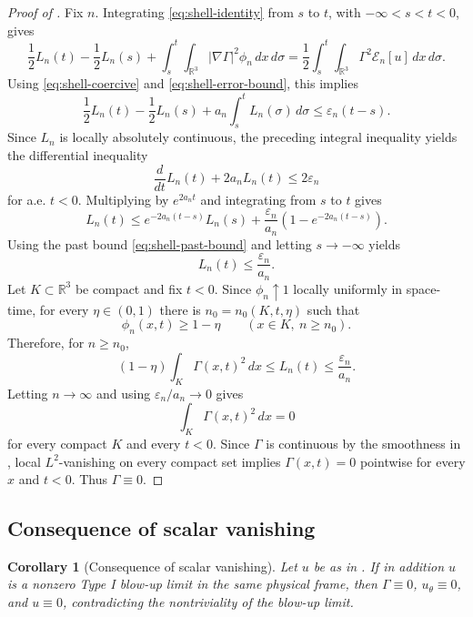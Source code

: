 \documentclass[11pt]{amsart}
\theoremstyle{plain}
\newtheorem{corollary}[theorem]{Corollary}
\theoremstyle{definition}
\theoremstyle{remark}
\numberwithin{equation}{section}
\begin{document}
\begin{proof}[Proof of ]
Fix \(n\).  Integrating \eqref{eq:shell-identity} from \(s\) to \(t\), with
\(-\infty<s<t<0\), gives
\[
   \frac12L_n(t)-\frac12L_n(s)
   +
   \int_s^t\int_{\mathbb R^3}|\nabla\Gamma|^2\phi_n\,dx\,d\sigma
   =
   \frac12\int_s^t\int_{\mathbb R^3}\Gamma^2\mathcal E_n[u]\,dx\,d\sigma .
\]
Using \eqref{eq:shell-coercive} and \eqref{eq:shell-error-bound}, this implies
\[
   \frac12L_n(t)-\frac12L_n(s)
   +
   a_n\int_s^tL_n(\sigma)\,d\sigma
   \le
   \varepsilon_n(t-s).
\]
Since \(L_n\) is locally absolutely continuous, the preceding integral
inequality yields the differential inequality
\[
   \frac{d}{dt}L_n(t)+2a_nL_n(t)\le2\varepsilon_n
\]
for a.e. \(t<0\).  Multiplying by \(e^{2a_nt}\) and integrating from \(s\) to
\(t\) gives
\[
   L_n(t)
   \le
   e^{-2a_n(t-s)}L_n(s)
   +
   \frac{\varepsilon_n}{a_n}
   \left(1-e^{-2a_n(t-s)}\right).
\]
Using the past bound \eqref{eq:shell-past-bound} and letting
\(s\to-\infty\) yields
\[
   L_n(t)\le \frac{\varepsilon_n}{a_n}.
\]
Let \(K\subset\mathbb R^3\) be compact and fix \(t<0\).  Since
\(\phi_n\uparrow1\) locally uniformly in space-time, for every
\(\eta\in(0,1)\) there is \(n_0=n_0(K,t,\eta)\) such that
\[
   \phi_n(x,t)\ge 1-\eta
   \qquad (x\in K,\ n\ge n_0).
\]
Therefore, for \(n\ge n_0\),
\[
   (1-\eta)\int_K\Gamma(x,t)^2\,dx
   \le
   L_n(t)
   \le
   \frac{\varepsilon_n}{a_n}.
\]
Letting \(n\to\infty\) and using \(\varepsilon_n/a_n\to0\) gives
\[
   \int_K\Gamma(x,t)^2\,dx=0
\]
for every compact \(K\) and every \(t<0\).  Since \(\Gamma\) is continuous by
the smoothness in , local \(L^2\)-vanishing on every
compact set implies \(\Gamma(x,t)=0\) pointwise for every \(x\) and \(t<0\).
Thus \(\Gamma\equiv0\).
\end{proof}

\subsection{Consequence of scalar vanishing}

\begin{corollary}[Consequence of scalar vanishing]\label{cor:zero-gamma}
Let \(u\) be as in .  If in addition \(u\)
is a nonzero Type I blow-up limit in the same physical frame, then
\(\Gamma\equiv0\), \(u_\theta\equiv0\), and \(u\equiv0\),
contradicting the nontriviality of the blow-up limit.
\end{corollary}
\end{document}
